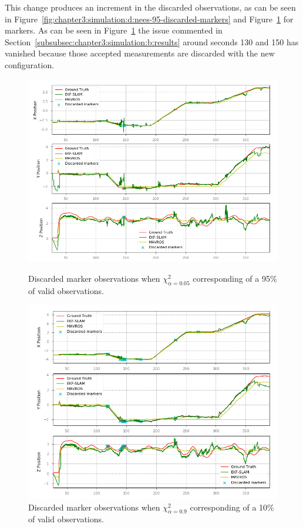This change produces an increment in the discarded observations, as can be seen in Figure~\ref{fig:chapter3:simulation:d:nees-95-discarded-markers} and Figure~\ref{fig:chapter3:simulation:d:nees-10-discarded-markers} for markers. As can be seen in Figure~\ref{fig:chapter3:simulation:d:nees-10-discarded-markers} the issue commented in Section~\ref{subsubsec:chapter3:simulation:b:results} around seconds 130 and 150 has vanished because those accepted measurements are discarded with the new configuration.\\
\begin{figure}
    \centering
    \includegraphics[width=\textwidth]{Images/fig24-nees-95-path-discarded-markers.png}
    \caption[Discarded marker observations when $\chi_{\alpha=0.05}^2$]{Discarded marker observations when $\chi_{\alpha=0.05}^2$ corresponding of a 95\% of valid observations.}
    \label{fig:chapter3:simulation:d:nees-95-discarded-markers}
    \centering
    \includegraphics[width=\textwidth]{Images/fig24-nees-10-path-discarded-markers.png}
    \caption[Discarded marker observations when $\chi_{\alpha=0.9}^2$]{Discarded marker observations when $\chi_{\alpha=0.9}^2$ corresponding of a 10\% of valid observations.}
    \label{fig:chapter3:simulation:d:nees-10-discarded-markers}
\end{figure}

